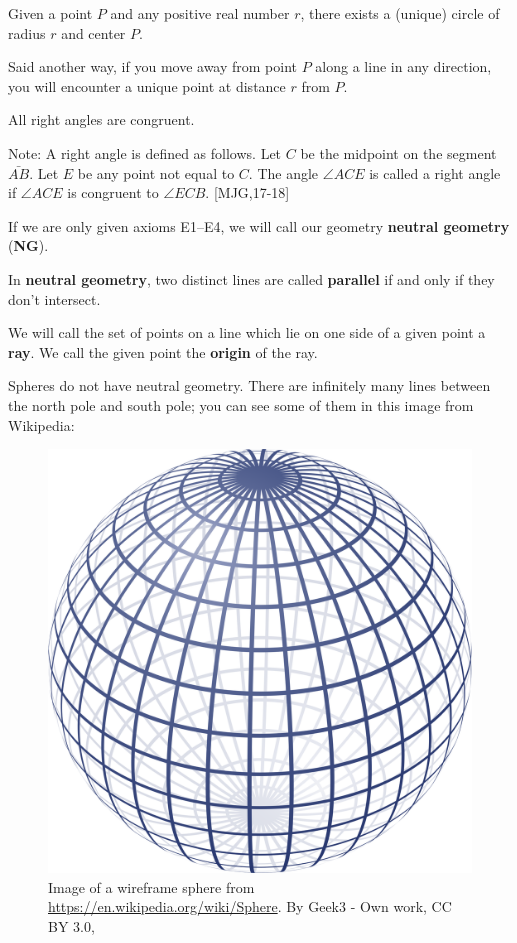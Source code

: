 \documentclass[instructornotes]{ximera}
\begin{document}
\begin{axiom}[E3]
Given a point $P$ and any positive real number $r$, there exists a
(unique) circle of radius $r$ and center $P$. 

Said another way, if you move away from point $P$ along a line in any
direction, you will encounter a unique point at distance $r$ from $P$.
\end{axiom}

\begin{axiom}[E4]
All right angles are congruent.

Note: A right angle is defined as follows. Let $C$ be the midpoint on
the segment $\bar{AB}$. Let $E$ be any point not equal to
$C$. The angle $\angle ACE$ is called a right angle if $\angle ACE$ is
congruent to $\angle ECB$. [MJG,17-18]
\end{axiom}

\begin{definition}
If we are only given axioms E1--E4, we will call our
geometry \textbf{neutral geometry} (\textbf{NG}).
\end{definition}

\begin{definition}
In \textbf{neutral geometry}, two distinct lines are called \textbf{parallel} if and
only if they don't intersect.
\end{definition}



\begin{definition} 
We will call the set of points on a line which lie on one side of a
given point a \textbf{ray}.  We call the given point the
\textbf{origin} of the ray.
\end{definition}

\begin{remark}
 Spheres do not have neutral geometry. There are infinitely many lines between the north pole and south pole; you can see some of them in this image from Wikipedia:
 
\begin{figure}[h]
 \includegraphics[width=.5\textwidth]{euclidsPostulatesForPlaneGeometry/Sphere.png}
\caption{Image of a wireframe sphere from \url{https://en.wikipedia.org/wiki/Sphere}. By Geek3 - Own work, CC BY 3.0, %
}
\end{figure}
\end{remark}
\end{document}
